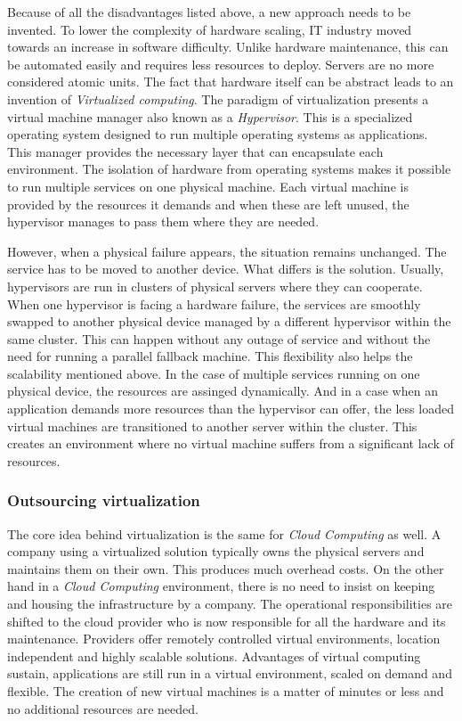 Because of all the disadvantages listed above, a new approach needs to be invented. To lower the complexity of hardware scaling, IT industry moved towards an increase in software difficulty. Unlike hardware maintenance, this can be automated easily and requires less resources to deploy. Servers are no more considered atomic units. The fact that hardware itself can be abstract leads to an invention of \emph{Virtualized computing}. The paradigm of virtualization presents a virtual machine manager also known as a \emph{Hypervisor}. This is a specialized operating system designed to run multiple operating systems as applications. This manager provides the necessary layer that can encapsulate each environment. The isolation of hardware from operating systems makes it possible to run multiple services on one physical machine. Each virtual machine is provided by the resources it demands and when these are left unused, the hypervisor manages to pass them where they are needed.

However, when a physical failure appears, the situation remains unchanged. The service has to be moved to another device. What differs is the solution. Usually, hypervisors are run in clusters of physical servers where they can cooperate. When one hypervisor is facing a hardware failure, the services are smoothly swapped to another physical device managed by a different hypervisor within the same cluster. This can happen without any outage of service and without the need for running a parallel fallback machine. This flexibility also helps the scalability mentioned above. In the case of multiple services running on one physical device, the resources are assinged dynamically. And in a case when an application demands more resources than the hypervisor can offer, the less loaded virtual machines are transitioned to another server within the cluster. This creates an environment where no virtual machine suffers from a significant lack of resources.

\subsubsection{Outsourcing virtualization}
\label{subs:Outsourcing virtualization}

The core idea behind virtualization is the same for \emph{Cloud Computing} as well. A company using a virtualized solution typically owns the physical servers and maintains them on their own. This produces much overhead costs. On the other hand in a \emph{Cloud Computing} environment, there is no need to insist on keeping and housing the infrastructure by a company. The operational responsibilities are shifted to the cloud provider who is now responsible for all the hardware and its maintenance. Providers offer remotely controlled virtual environments, location independent and highly scalable solutions. Advantages of virtual computing sustain, applications are still run in a virtual environment, scaled on demand and flexible. The creation of new virtual machines is a matter of minutes or less and no additional resources are needed.

